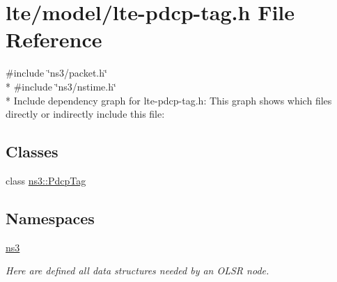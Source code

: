 \hypertarget{lte-pdcp-tag_8h}{}\section{lte/model/lte-\/pdcp-\/tag.h File Reference}
\label{lte-pdcp-tag_8h}
{\ttfamily \#include \char`\"{}ns3/packet.\+h\char`\"{}}\\*
{\ttfamily \#include \char`\"{}ns3/nstime.\+h\char`\"{}}\\*
Include dependency graph for lte-\/pdcp-\/tag.h\+:
This graph shows which files directly or indirectly include this file\+:
\subsection*{Classes}
\begin{DoxyCompactItemize}
\item 
class \hyperlink{classns3_1_1PdcpTag}{ns3\+::\+Pdcp\+Tag}
\end{DoxyCompactItemize}
\subsection*{Namespaces}
\begin{DoxyCompactItemize}
\item 
 \hyperlink{namespacens3}{ns3}
\begin{DoxyCompactList}\small\item\em Here are defined all data structures needed by an O\+L\+SR node. \end{DoxyCompactList}\end{DoxyCompactItemize}
